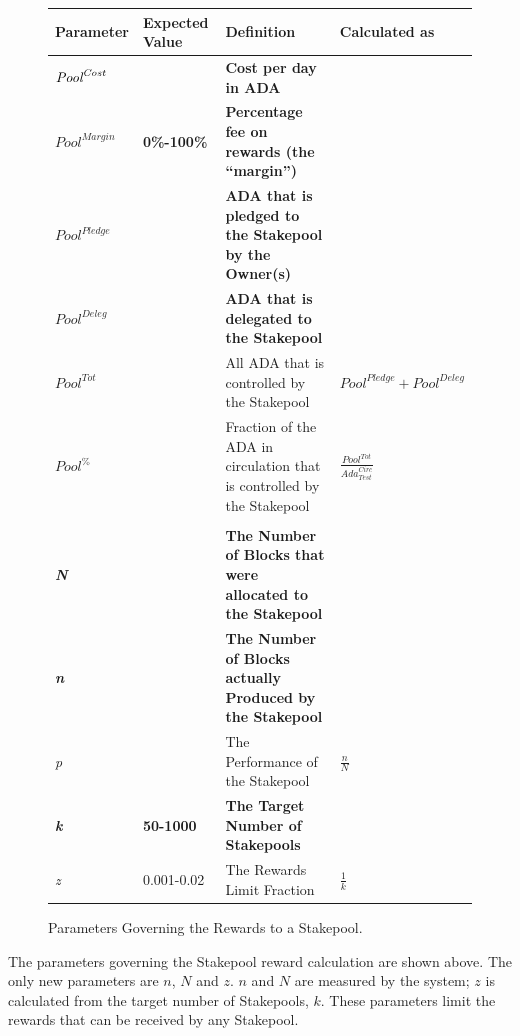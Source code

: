 \documentclass[11pt,a4paper,dvipsnames,twosided,final]{article}
\newcommand{\khcomment}[1]{\todo[color=blue!20]{KH: #1}}
\newcommand{\ada}{ADA{}}
\begin{document}
\begin{figure}[h!]
\begin{center}
\begin{tabular}{||l|l|p{6cm}|l||}
  \hline \hline
\textbf{Parameter} & \textbf{Expected Value} & \textbf{Definition} & \textbf{Calculated as} \\\hline
  \textbf{\color{red} $\textit{\textit{Pool}}^{\textit{Cost}}$} &  & \textbf{\color{red} Cost per day in \ada{}} & \\\hline
\textbf{\color{red} ${\textit{Pool}}^{\textit{Margin}}$} &  \textbf{\color{red} 0\%-100\%} & \textbf{\color{red} Percentage fee on rewards (the ``margin'')} & \\\hline
\textbf{\color{red} ${\textit{Pool}}^\textit{Pledge}$} & & \textbf{\color{red} \ada{} that is pledged to the Stakepool by the Owner(s)} & \\\hline
\textbf{\color{blue} ${\textit{Pool}}^\textit{Deleg}$} & & \textbf{\color{blue} \ada{} that is delegated to the Stakepool} & \\\hline
${\textit{Pool}}^{Tot}$ & & All \ada{} that is controlled by the Stakepool & ${\textit{Pool}}^\textit{Pledge} + {\textit{Pool}}^\textit{Deleg}$ \\\hline
  ${\textit{Pool}}^\%$ & & Fraction of the \ada{} in circulation that is controlled by the Stakepool & {\large $\frac{{\textit{Pool}}^{Tot}}{\textit{Ada}^{\textit{Circ}}_{\textit{Test}}}$} \\\hline
&&&  \\\hline
\textbf{\color{cyan} \emph{N}} & & \textbf{\color{cyan} The Number of Blocks that were allocated to the Stakepool} & \\\hline
\textbf{\color{cyan} \emph{n}} & & \textbf{\color{cyan} The Number of Blocks actually Produced by the Stakepool} & \\\hline
\emph{p} & & The Performance of the Stakepool & $\frac{n}{N}$ \\\hline
\textbf{\color{green} \emph{k}} &\textbf{\color{green} 50-1000} & \textbf{\color{green} The Target Number of Stakepools} & \\\hline
\emph{z} & 0.001-0.02 & The Rewards Limit Fraction & $\frac{1}{k}$ \\\hline
\hline
\end{tabular}
\end{center}
\caption{Parameters Governing the Rewards to a Stakepool.}
\label{fig:rewards}
\end{figure}

\noindent
The parameters governing the Stakepool reward calculation are shown above.  The only new
parameters are $n$, $N$ and $z$. $n$ and $N$ are measured by the system; $z$ is calculated from the
target number of Stakepools, $k$.  These parameters limit the rewards that can be received by any Stakepool.
\end{document}
